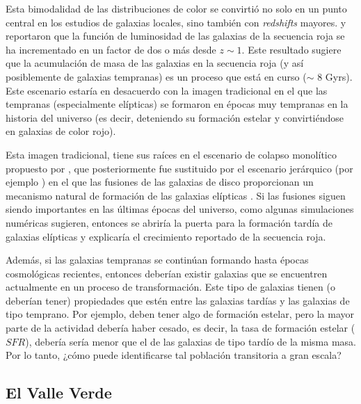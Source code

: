 \bigskip

\noindent Esta bimodalidad de las distribuciones de color se convirtió no solo en un punto central en los estudios de galaxias locales, sino también con \textsl{redshifts}  mayores. \cite{bell2004} y \cite{faber2007} reportaron que la función de luminosidad de las galaxias de la secuencia roja se ha incrementado en un factor de dos o más desde $z \sim 1$. Este resultado sugiere que la acumulación de masa de las galaxias en la secuencia roja (y así posiblemente de galaxias tempranas) es un proceso que está en curso ($\sim$ 8 Gyrs). Este escenario estaría en desacuerdo con la imagen tradicional en el que las tempranas (especialmente elípticas) se formaron
en épocas muy tempranas en la historia del universo (es decir, deteniendo su formación estelar y convirtiéndose en galaxias de color rojo).

\bigskip


\noindent Esta imagen tradicional, tiene sus raíces en el escenario de colapso monolítico propuesto por \cite{eggen1962}, que posteriormente fue sustituido por el escenario jerárquico (por ejemplo \cite{kaufmann2006}) en el que las fusiones de las galaxias de disco proporcionan un mecanismo natural de formación de las galaxias elípticas \citep{barnes1996}. Si las fusiones siguen siendo importantes en las últimas épocas del universo, como algunas simulaciones numéricas sugieren, entonces se abriría la puerta para la formación tardía de galaxias elípticas y explicaría el crecimiento reportado de la secuencia roja.

\bigskip

\noindent Además, si las galaxias tempranas se continúan formando hasta épocas cosmológicas recientes, entonces  deberían existir galaxias que se encuentren actualmente en un proceso de transformación. Este tipo de galaxias tienen (o deberían tener) propiedades que estén entre las galaxias tardías y las galaxias de tipo temprano. Por ejemplo, deben tener algo de formación estelar, pero la mayor parte de la actividad debería haber cesado, es decir, la tasa de formación estelar ($SFR$), debería sería menor que el de las galaxias de tipo tardío de la misma masa. Por lo tanto, ¿cómo  puede identificarse tal población transitoria a gran escala?

\subsection{El Valle Verde}

